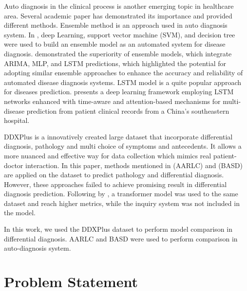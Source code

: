 \documentclass{article}
\begin{document}
Auto diagnosis in the clinical process is another emerging  topic in healthcare area. Several academic paper has demonstrated its importance and provided different methods. Ensemble method is an approach used in auto diagnosis system. In \parencite{Sunena_2021}, deep Learning, support vector machine (SVM), and decision tree were used to build an ensemble model as an automated system for disease diagnosis.
\parencite{Kaushik_2020} demonstrated the superiority of ensemble models, which integrate ARIMA, MLP, and LSTM predictions, which highlighted the potential for adopting similar ensemble approaches to enhance the accuracy and reliability of automated disease diagnosis systems. LSTM model is a quite popular approach for diseases prediction. \parencite{Men_2021} presents a deep learning framework employing LSTM networks enhanced with time-aware and attention-based mechanisms for multi-disease prediction from patient clinical records from a China's southeastern hospital.

DDXPlus\parencite{Fansi_2022} is a innovatively created large dataset that incorporate differential diagnosis, pathology and multi choice of symptoms and antecedents. It allows a more nuanced and effective way for data collection which mimics real patient-doctor interaction.  In this paper, methods mentioned in \parencite{Yuan_2024}(AARLC) and \parencite{Luo_2021}(BASD) are applied on the dataset to predict pathology and differential diagnosis. However, these approaches failed to achieve promising result in differential diagnosis prediction. Following by \parencite{Alam_2023}, a transformer model was used to the same dataset and reach higher metrics, while the inquiry system was not included in the model.

In this work, we used the DDXPlus dataset to perform model comparison in  differential diagnosis. AARLC and BASD were used to perform comparison in auto-diagnosis system.

\section{Problem Statement}
\end{document}
